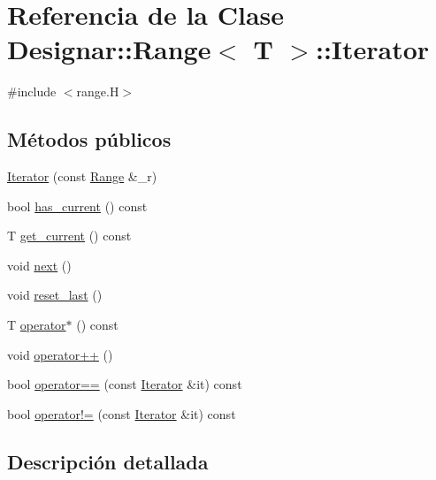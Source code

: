 \hypertarget{class_designar_1_1_range_1_1_iterator}{}\section{Referencia de la Clase Designar\+:\+:Range$<$ T $>$\+:\+:Iterator}
\label{class_designar_1_1_range_1_1_iterator}


{\ttfamily \#include $<$range.\+H$>$}

\subsection*{Métodos públicos}
\begin{DoxyCompactItemize}
\item 
\hyperlink{class_designar_1_1_range_1_1_iterator_a25257fadc62207bcc4ca4b82b2b4c0cb}{Iterator} (const \hyperlink{class_designar_1_1_range}{Range} \&\+\_\+r)
\item 
bool \hyperlink{class_designar_1_1_range_1_1_iterator_a9645d6d68aa53949d8c85d2af91e55c9}{has\+\_\+current} () const
\item 
T \hyperlink{class_designar_1_1_range_1_1_iterator_a388c108434e6ff65af07ee3bc0d98204}{get\+\_\+current} () const
\item 
void \hyperlink{class_designar_1_1_range_1_1_iterator_ad337cc1a463bd9ebea6691efdc5b7b4f}{next} ()
\item 
void \hyperlink{class_designar_1_1_range_1_1_iterator_ae5a8045527f0582b9a0f126ccf50ae19}{reset\+\_\+last} ()
\item 
T \hyperlink{class_designar_1_1_range_1_1_iterator_a509ac661c1e51ad60c37e1d8a82e9442}{operator$\ast$} () const
\item 
void \hyperlink{class_designar_1_1_range_1_1_iterator_accce459b0752c7e347c8434582b58268}{operator++} ()
\item 
bool \hyperlink{class_designar_1_1_range_1_1_iterator_a0c3ce6ecdc451e8f8f91d114485abb2b}{operator==} (const \hyperlink{class_designar_1_1_range_1_1_iterator}{Iterator} \&it) const
\item 
bool \hyperlink{class_designar_1_1_range_1_1_iterator_a06ee05b2aae390d9520de1683ff9ff01}{operator!=} (const \hyperlink{class_designar_1_1_range_1_1_iterator}{Iterator} \&it) const
\end{DoxyCompactItemize}


\subsection{Descripción detallada}
